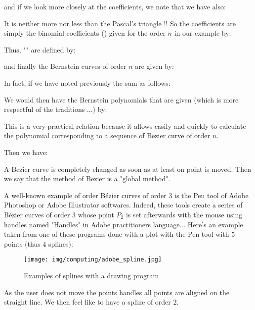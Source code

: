 	and if we look more closely at the coefficients, we note that we have also:
	
	It is neither more nor less than the Pascal's triangle !! So the coefficients are simply the binomial coefficients () given for the order $n$ in our example by:
	
	Thus, "" are defined by:
	
	and finally the Bernstein curves of order $n$ are given by:
	
	In fact, if we have noted previously the sum as follows:
	
	We would then have the Bernstein polynomials that are given (which is more respectful of the traditions ...) by:
	
	This is a very practical relation because it allows easily and quickly to calculate the polynomial corresponding to a sequence of Bezier curve of order $n$.
	
	Then we have:
	
	\begin{tcolorbox}[title=Remark,colframe=black,arc=10pt]
	A Bezier curve is completely changed as soon as at least on point is moved. Then we say that the method of Bezier is a "global method".
	\end{tcolorbox}	
	A well-known example of order Bézier curves of order $3$ is the Pen tool of Adobe Photoshop or Adobe Illustrator softwares. Indeed, these tools create a series of Bézier curves of order $3$ whose point $P_2$ is set afterwards with the mouse using handles named "Handles" in Adobe practitioners language... Here's an example taken from one of these programs done with a plot with the Pen tool with $5$ points (thus $4$ splines):
	\begin{figure}[H]
		\centering
		\texttt{[image: img/computing/adobe\_spline.jpg]}
		\caption{Examples of splines with a drawing program}
	\end{figure}
	As the user does not move the points handles all points are aligned on the straight line. We then feel like to have a spline of order $2$.
	
